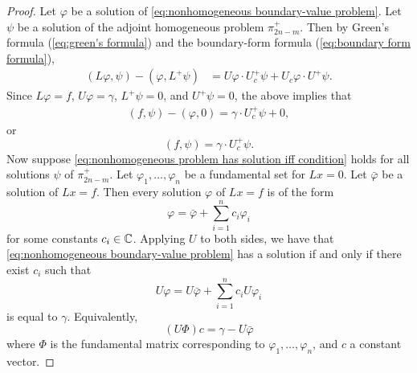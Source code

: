 \documentclass[11pt, oneside, a4paper]{article}
\begin{document}
\begin{proof}
    Let $\varphi$ be a solution of \ref{eq:nonhomogeneous boundary-value problem}. Let $\psi$ be a solution of the adjoint homogeneous problem $\pi_{2n-m}^+$. Then by Green's formula (\ref{eq:green's formula}) and the boundary-form formula (\ref{eq:boundary form formula}), 
    \begin{align*}
        (L\varphi, \psi) - (\varphi, L^+\psi) &= U\varphi\cdot U_c^+\psi + U_c\varphi\cdot U^+\psi.
    \end{align*}
    Since $L\varphi=f$, $U\varphi=\gamma$, $L^+\psi=0$, and $U^+\psi=0$, the above implies that
    \begin{align*}
        (f,\psi) - (\varphi, 0) = \gamma\cdot U_c^+\psi + 0,
    \end{align*}
    or
    \[(f,\psi)=\gamma\cdot U_c^+\psi.\]
    Now suppose \ref{eq:nonhomogeneous problem has solution iff condition} holds for all solutions $\psi$ of $\pi_{2n-m}^+$. Let $\varphi_1,\ldots,\varphi_n$ be a fundamental set for $Lx=0$. Let $\bar{\varphi}$ be a solution of $Lx=f$. Then every solution $\varphi$ of $Lx=f$ is of the form
    \[\varphi = \bar{\varphi} + \sum_{i=1}^n c_i\varphi_i\]
    for some constants $c_i\in\mathbb C$. Applying $U$ to both sides, we have that \ref{eq:nonhomogeneous boundary-value problem} has a solution if and only if there exist $c_i$ such that
    \[U\varphi = U\bar{\varphi} + \sum_{i=1}^n c_i U\varphi_i\]
    is equal to $\gamma$. Equivalently,
    \begin{equation}\label{eq:(U Phi)c=}
        (U\Phi)c=\gamma-U\bar{\varphi}
    \end{equation}
    where $\Phi$ is the fundamental matrix corresponding to $\varphi_1,\ldots,\varphi_n$, and $c$ a constant vector.
\end{proof}
\end{document}
